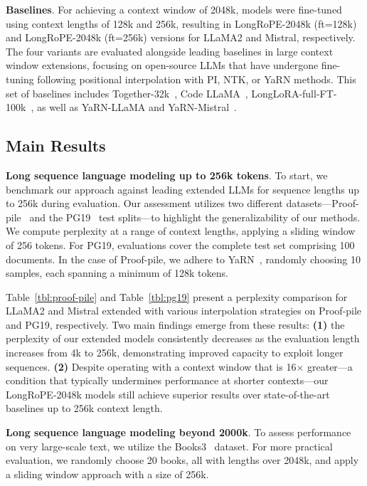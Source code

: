 \textbf{Baselines}. For achieving a context window of 2048k, models were fine-tuned using context lengths of 128k and 256k, resulting in LongRoPE-2048k (ft=128k) and LongRoPE-2048k (ft=256k) versions for LLaMA2 and Mistral, respectively. The four variants are evaluated alongside leading baselines in large context window extensions, focusing on open-source LLMs that have undergone fine-tuning following positional interpolation with PI, NTK, or YaRN methods. This set of baselines includes Together-32k~\cite{together}, Code LLaMA~\cite{codellama}, LongLoRA-full-FT-100k~\cite{longlora}, as well as YaRN-LLaMA and YaRN-Mistral~\cite{yarn}.

\subsection{Main Results}

\label{sec:mainresult}
\textbf{Long sequence language modeling up to 256k tokens}. To start, we benchmark our approach against leading extended LLMs for sequence lengths up to 256k during evaluation. Our assessment utilizes two different datasets—Proof-pile~\cite{pg19} and the PG19~\cite{pile} test splits—to highlight the generalizability of our methods. We compute perplexity at a range of context lengths, applying a sliding window of 256 tokens. For PG19, evaluations cover the complete test set comprising 100 documents. In the case of Proof-pile, we adhere to YaRN~\cite{yarn}, randomly choosing 10 samples, each spanning a minimum of 128k tokens.

Table~\ref{tbl:proof-pile} and Table~\ref{tbl:pg19} present a perplexity comparison for LLaMA2 and Mistral extended with various interpolation strategies on Proof-pile and PG19, respectively. Two main findings emerge from these results: \textbf{(1)} the perplexity of our extended models consistently decreases as the evaluation length increases from 4k to 256k, demonstrating improved capacity to exploit longer sequences. \textbf{(2)} Despite operating with a context window that is 16$\times$ greater—a condition that typically undermines performance at shorter contexts—our LongRoPE-2048k models still achieve superior results over state-of-the-art baselines up to 256k context length.

\textbf{Long sequence language modeling beyond 2000k}. To assess performance on very large-scale text, we utilize the Books3~\cite{pile} dataset. For more practical evaluation, we randomly choose 20 books, all with lengths over 2048k, and apply a sliding window approach with a size of 256k.

